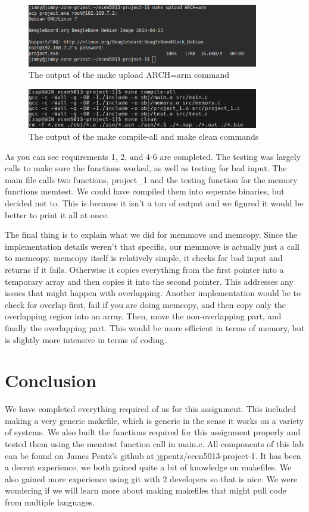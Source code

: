 \documentclass{article}
\begin{document}
\begin{figure}[H]
    \centering
    \includegraphics[width=0.9\textwidth]{scp_pic.png}
    \caption{The output of the make upload ARCH=arm command}
\end{figure}

\begin{figure}[H]
    \centering
    \includegraphics[width=0.9\textwidth]{other_make.png}
    \caption{The output of the make compile-all and make clean commands}
\end{figure}

As you can see requirements 1, 2, and 4-6 are completed. The testing was largely calls to make sure the functions worked, as well as testing for bad input. The main file calls two functions, project\_1 and the testing function for the memory functions memtest. We could have compiled them into seperate binaries, but decided not to. This is because it isn't a ton of output and we figured it would be better to print it all at once.

The final thing is to explain what we did for memmove and memcopy. Since the implementation details weren't that specific, our memmove is actually just a call to memcopy. memcopy itself is relatively simple, it checks for bad input and returns if it fails. Otherwise it copies everything from the first pointer into a temporary array and then copies it into the second pointer. This addresses any issues that might happen with
overlapping. Another implementation would be to check for overlap first, fail if you are doing memcopy, and then copy only the overlapping region into an array. Then, move the non-overlapping part, and finally the overlapping part. This would be more efficient in terms of memory, but is slightly more intensive in terms of coding. 

\section*{Conclusion}
We have completed everything required of us for this assignment. This included making a very generic makefile, which is generic in the sense it works on a variety of systems. We also built the functions required for this assignment properly and tested them using the memtest function call in main.c. All components of this lab can be found on James Pentz's github at jgpentz/ecen5013-project-1. It has been a decent experience, we both gained quite a bit of knowledge on makefiles. We
also gained more experience using git with 2 developers so that is nice. We were wondering if we will learn more about making makefiles that might pull code from multiple languages.

\end{document}

